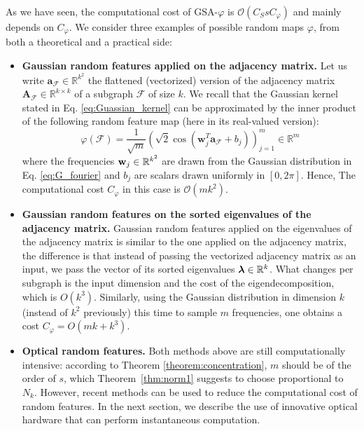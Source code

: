 As we have seen, the computational cost of GSA-$\varphi$ is $\mathcal{O}(C_S s C_\varphi)$ and mainly depends on $C_\varphi$. We consider three examples of possible random maps $\varphi$, from both a theoretical and a practical side:

\begin{itemize}
\item \textbf{Gaussian random features applied on the adjacency matrix.} Let us write $\mathbf{a}_\mathcal{F}\in\mathbb{R}^{k^2}$ the flattened (vectorized) version of the adjacency matrix $\mathbf{A}_\mathcal{F}\in\mathbb{R}^{k\times k}$ of a subgraph $\mathcal{F}$ of size $k$. We recall that the Gaussian kernel stated in Eq. \ref{eq:Guassian_kernel} can be approximated by the inner product of the following random feature map (here in its real-valued version):
\[
\varphi(\mathcal{F}) = \frac{1}{\sqrt{m}} \left( \sqrt{2} \cos(\mathbf{w}_j^T\mathbf{a}_\mathcal{F}+b_j) \right)_{j=1}^m \in \mathbb{R}^m
\]
where the frequencies $\mathbf{w}_j\in\mathbb{R}^{k^2}$ are drawn from the Gaussian distribution in Eq. \ref{eq:G_fourier} and $b_j$ are scalars drawn uniformly in $[0, 2\pi]$. Hence, The computational cost $C_\varphi$ in this case is $\mathcal{O}(mk^2)$.

\item \textbf{Gaussian random features on the sorted eigenvalues of the adjacency matrix.} Gaussian random features applied on the eigenvalues of the adjacency matrix is similar to the one applied on the adjacency matrix, the difference is that instead of passing the vectorized adjacency matrix as an input, we pass the  vector of its sorted eigenvalues $\bm{\lambda}\in\mathbb{R}^k$. What changes per subgraph is the input dimension and the cost of the eigendecomposition, which is $O(k^3)$. Similarly, using the Gaussian distribution in dimension $k$ (instead of $k^2$ previously) this time to sample $m$ frequencies, one obtains a cost $C_{\varphi}=O(mk+k^3)$.

\item \textbf{Optical random features.} Both methods above are still computationally intensive: according to Theorem \ref{theorem:concentration}, $m$ should be of the order of $s$, which Theorem~\ref{thm:norm1} suggests to choose proportional to $N_k$. However, recent methods can be used to reduce the computational cost of random features. In the next section, we describe the use of innovative optical hardware that can perform instantaneous computation.
\end{itemize}


